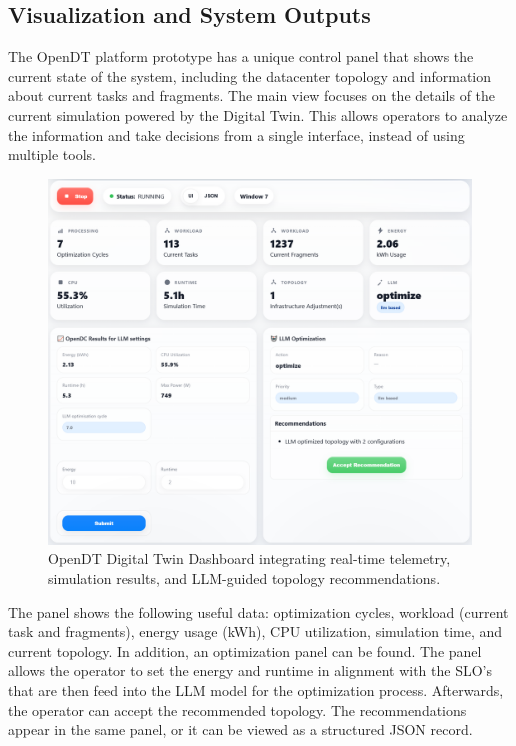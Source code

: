 \subsection{Visualization and System Outputs}

The OpenDT platform prototype has a unique control panel that shows the current state of the system, including the datacenter topology and information about current tasks and fragments. The main view  focuses on the details of the current simulation powered by the Digital Twin. This allows operators to analyze the information and take decisions from a single interface, instead of using multiple tools.

\begin{figure}[t]
    \centering
    \includegraphics[width=\linewidth]{figures/dashboard.png}
    \caption{OpenDT Digital Twin Dashboard integrating real-time telemetry, simulation results, and LLM-guided topology recommendations.}
    \label{fig:dashboard}
\end{figure}

The panel shows the following useful data: optimization cycles, workload (current task and fragments), energy usage (kWh), CPU utilization, simulation time, and current topology. In addition, an optimization panel can be found. The panel allows the operator to set the energy and runtime in alignment with the SLO's that are then feed into the LLM model for the optimization process.  Afterwards, the operator can accept the recommended topology. The recommendations appear in the same panel, or it can be viewed as a structured JSON record.

